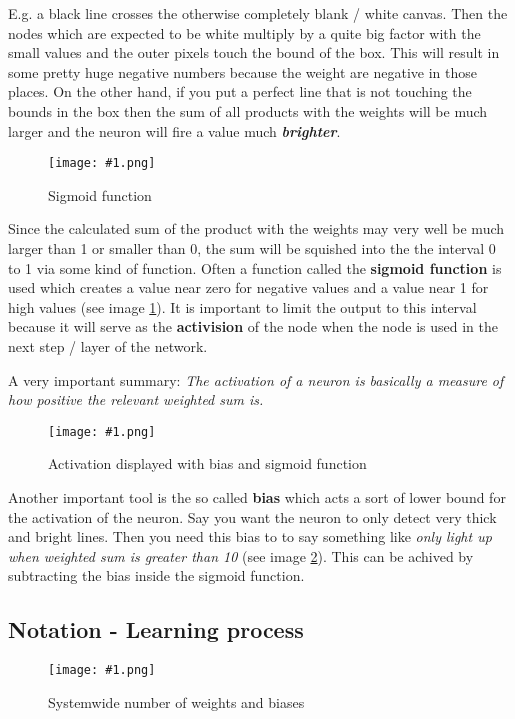 \documentclass{article}
\newcommand{\lbl}[1]{(see image \ref{#1})}
\newcommand{\img}[1]{
	\centering
	\texttt{[image: \#1.png]}
	\label{#1}
}
\begin{document}
E.g. a black line crosses the otherwise completely blank / white canvas. Then the nodes which are expected to be white multiply by a quite big factor with the small values and the outer pixels touch the bound of the box. This will result in some pretty huge negative numbers because the weight are negative in those places. On the other hand, if you put a perfect line that is not touching the bounds in the box then the sum of all products with the weights will be much larger and the neuron will fire a value much \textit{\textbf{brighter}}.

\begin{figure}[h]
\img{ai_9}
\caption{Sigmoid function}
\end{figure}

Since the calculated sum of the product with the weights may very well be much larger than 1 or smaller than 0, the sum will be squished into the the interval 0 to 1 via some kind of function. Often a function called the \textbf{sigmoid function} is used which creates a value near zero for negative values and a value near 1 for high values \lbl{ai_9}. It is important to limit the output to this interval because it will serve as the \textbf{activision} of the node when the node is used in the next step / layer of the network. 

A very important summary: \textit{The activation of a neuron is basically a measure of how positive the relevant weighted sum is.}


\begin{figure}[h]
\img{ai_10}
\caption{Activation displayed with bias and sigmoid function}
\end{figure}

Another important tool is the so called \textbf{bias} which acts a sort of lower bound for the activation of the neuron. Say you want the neuron to only detect very thick and bright lines. Then you need this bias to to say something like \textit{only light up when weighted sum is greater than 10} \lbl{ai_10}. This can be achived by subtracting the bias inside the sigmoid function.



\subsection{Notation - Learning process}

\begin{figure}[!htbp]
\img{ai_11}
\caption{Systemwide number of weights and biases}
\end{figure}
\end{document}
